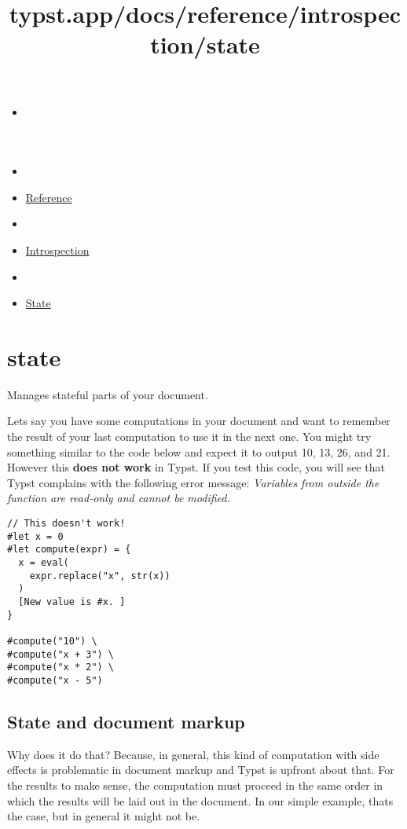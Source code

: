 \title{typst.app/docs/reference/introspection/state}

\begin{itemize}
\tightlist
\item
  \href{/docs}{}
\item
  
\item
  \href{/docs/reference/}{Reference}
\item
  
\item
  \href{/docs/reference/introspection/}{Introspection}
\item
  
\item
  \href{/docs/reference/introspection/state/}{State}
\end{itemize}

\section{\texorpdfstring{{ state }}{ state }}\label{summary}

Manages stateful parts of your document.

Let\textquotesingle s say you have some computations in your document
and want to remember the result of your last computation to use it in
the next one. You might try something similar to the code below and
expect it to output 10, 13, 26, and 21. However this \textbf{does not
work} in Typst. If you test this code, you will see that Typst complains
with the following error message: \emph{Variables from outside the
function are read-only and cannot be modified.}

\begin{verbatim}
// This doesn't work!
#let x = 0
#let compute(expr) = {
  x = eval(
    expr.replace("x", str(x))
  )
  [New value is #x. ]
}

#compute("10") \
#compute("x + 3") \
#compute("x * 2") \
#compute("x - 5")
\end{verbatim}

\subsection{State and document markup}\label{state-and-markup}

Why does it do that? Because, in general, this kind of computation with
side effects is problematic in document markup and Typst is upfront
about that. For the results to make sense, the computation must proceed
in the same order in which the results will be laid out in the document.
In our simple example, that\textquotesingle s the case, but in general
it might not be.

